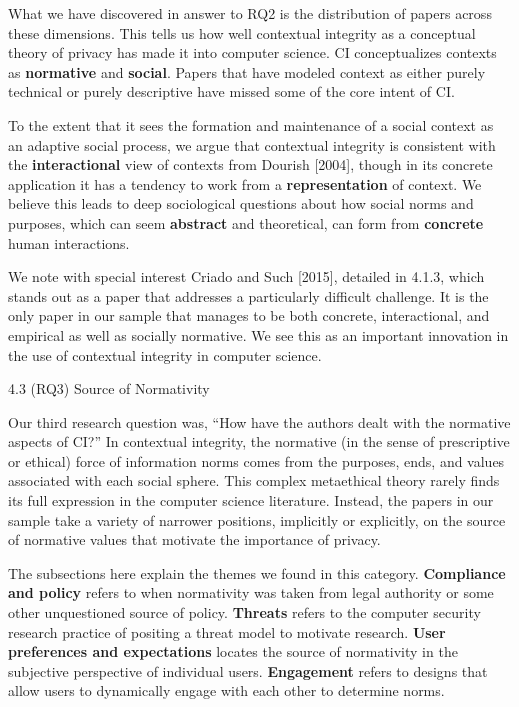 \documentclass[../thesis.tex]{subfiles}
\begin{document}
What we have discovered in answer to RQ2 is the distribution of papers
across these dimensions. This tells us how well contextual integrity as
a conceptual theory of privacy has made it into computer science. CI
conceptualizes contexts as \textbf{normative} and \textbf{social}.
Papers that have modeled context as either purely technical or purely
descriptive have missed some of the core intent of CI.

To the extent that it sees the formation and maintenance of a social
context as an adaptive social process, we argue that contextual
integrity is consistent with the \textbf{interactional }view of
contexts from Dourish [2004], though in its concrete application it has
a tendency to work from a \textbf{representation} of context. We
believe this leads to deep sociological questions about how social
norms and purposes, which can seem \textbf{abstract} and theoretical,
can form from \textbf{concrete} human interactions. 

We note with special interest Criado and Such [2015], detailed in 4.1.3,
which stands out as a paper that addresses a particularly difficult
challenge. It is the only paper in our sample that manages to be both
concrete, interactional, and empirical as well as socially normative.
We see this as an important innovation in the use of contextual
integrity in computer science.


\bigskip

{\color[rgb]{0.2627451,0.2627451,0.2627451}
4.3 (RQ3) Source of Normativity}

Our third research question was, ``How have the authors
dealt with the normative aspects of CI?'' In
contextual integrity, the normative (in the sense of prescriptive or
ethical) force of information norms comes from the purposes, ends, and
values associated with each social sphere. This complex metaethical
theory rarely finds its full expression in the computer science
literature. Instead, the papers in our sample take a variety of
narrower positions, implicitly or explicitly, on the source of
normative values that motivate the importance of privacy.


\bigskip

The subsections here explain the themes we found in this category.
\textbf{Compliance and policy} refers to when normativity was taken
from legal authority or some other unquestioned source of policy.
\textbf{Threats} refers to the computer security research practice of
positing a threat model to motivate research. \textbf{User preferences
and expectations} locates the source of normativity in the subjective
perspective of individual users. \textbf{Engagement} refers to designs
that allow users to dynamically engage with each other to determine
norms.
\end{document}

